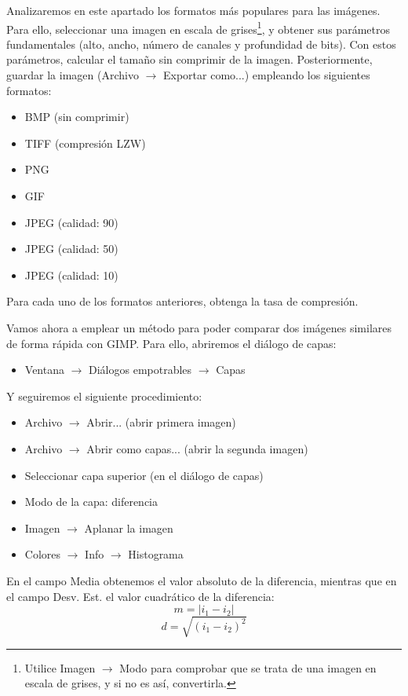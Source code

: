 \documentclass[es,practica]{uah}
\begin{document}
Analizaremos en este apartado los formatos más populares para las imágenes. Para ello, seleccionar una imagen en escala de grises\footnote{Utilice Imagen $\rightarrow$ Modo para comprobar que se trata de una imagen en escala de grises, y si no es así, convertirla.}, y obtener sus parámetros fundamentales (alto, ancho, número de canales y profundidad de bits). Con estos parámetros, calcular el tamaño sin comprimir de la imagen. Posteriormente, guardar la imagen (Archivo $\rightarrow$ Exportar como...) empleando los siguientes formatos:
\begin{itemize}
	\item BMP (sin comprimir)
	\item TIFF (compresión LZW)
	\item PNG
	\item GIF
	\item JPEG (calidad: 90)
	\item JPEG (calidad: 50)
	\item JPEG (calidad: 10)
\end{itemize}

Para cada uno de los formatos anteriores, obtenga la tasa de compresión.

Vamos ahora a emplear un método para poder comparar dos imágenes similares de forma rápida con GIMP. Para ello, abriremos el diálogo de capas:
\begin{itemize}
	\item Ventana $\rightarrow$ Diálogos empotrables $\rightarrow$ Capas
\end{itemize}

Y seguiremos el siguiente procedimiento:
\begin{itemize}
	\item Archivo $\rightarrow$ Abrir... (abrir primera imagen)
	\item Archivo $\rightarrow$ Abrir como capas... (abrir la segunda imagen)
	\item Seleccionar capa superior (en el diálogo de capas)
	\item Modo de la capa: diferencia
	\item Imagen $\rightarrow$ Aplanar la imagen
	\item Colores $\rightarrow$ Info $\rightarrow$ Histograma
\end{itemize}


En el campo Media obtenemos el valor absoluto de la diferencia, mientras que en el campo Desv. Est. el valor cuadrático de la diferencia:
\begin{displaymath}
	m = |i_1 - i_2 |
\end{displaymath}
\begin{displaymath}
	d = \sqrt{(i_1-i_2)^2}
\end{displaymath}
\end{document}
